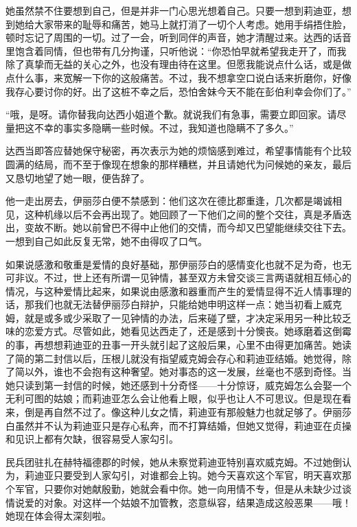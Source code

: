 \par 她虽然禁不住要想到自己，但是并非一门心思光想着自己。只要一想到莉迪亚，想到她给大家带来的耻辱和痛苦，她马上就打消了一切个人考虑。她用手绢捂住脸，顿时忘记了周围的一切。过了一会，听到同伴的声音，她才清醒过来。达西的话音里饱含着同情，但也带有几分拘谨，只听他说：“你恐怕早就希望我走开了，而我除了真挚而无益的关心之外，也没有理由待在这里。但愿我能说点什么话，或是做点什么事，来宽解一下你的这般痛苦。不过，我不想拿空口说白话来折磨你，好像我存心要讨你的好。出了这桩不幸之后，恐怕舍妹今天不能在彭伯利幸会你们了。”
\par “哦，是呀。请你替我向达西小姐道个歉。就说我们有急事，需要立即回家。请尽量把这不幸的事实多隐瞒一些时候。不过，我知道也隐瞒不了多久。”
\par 达西当即答应替她保守秘密，再次表示为她的烦恼感到难过，希望事情能有个比较圆满的结局，而不至于像现在想象的那样糟糕，并且请她代为问候她的亲友，最后又恳切地望了她一眼，便告辞了。
\par 他一走出房去，伊丽莎白便不禁感到：他们这次在德比郡重逢，几次都是竭诚相见，这种机缘以后不会再出现了。她回顾了一下他们之间的整个交往，真是矛盾迭出，变故不断。她以前曾巴不得中止他们的交情，而今却又巴望能继续交往下去。一想到自己如此反复无常，她不由得叹了口气。
\par 如果说感激和敬重是爱情的良好基础，那伊丽莎白的感情变化也就不足为奇，也无可非议。不过，世上还有所谓一见钟情，甚至双方未曾交谈三言两语就相互倾心的情况，与这种爱情比起来，如果说由感激和器重而产生的爱情显得不近人情事理的话，那我们也就无法替伊丽莎白辩护，只能给她申明这样一点：她当初看上威克姆，就是或多或少采取了一见钟情的办法，后来碰了壁，才决定采用另一种比较乏味的恋爱方式。尽管如此，她看见达西走了，还是感到十分懊丧。她琢磨着这倒霉的事，再想想莉迪亚的丑事一开头就引起了这般后果，心里不由得更加痛苦。她读了简的第二封信以后，压根儿就没有指望威克姆会存心和莉迪亚结婚。她觉得，除了简以外，谁也不会抱有这种奢望。她对事态的这一发展，丝毫也不感到奇怪。当她只读到第一封信的时候，她还感到十分奇怪——十分惊讶，威克姆怎么会娶一个无利可图的姑娘；而莉迪亚怎么会让他看上眼，似乎也让人不可思议。但是现在看来，倒是再自然不过了。像这种儿女之情，莉迪亚有那般魅力也就足够了。伊丽莎白虽然并不认为莉迪亚只是存心私奔，而不打算结婚，但她又觉得，莉迪亚在贞操和见识上都有欠缺，很容易受人家勾引。
\par 民兵团驻扎在赫特福德郡的时候，她从未察觉莉迪亚特别喜欢威克姆。不过她倒认为，莉迪亚只要受到人家勾引，对谁都会上钩。她今天喜欢这个军官，明天喜欢那个军官，只要你对她献殷勤，她就会看中你。她一向用情不专，但是从未缺少过谈情说爱的对象。对这样一个姑娘不加管教，恣意纵容，结果造成这般恶果——哦！她现在体会得太深刻啦。
